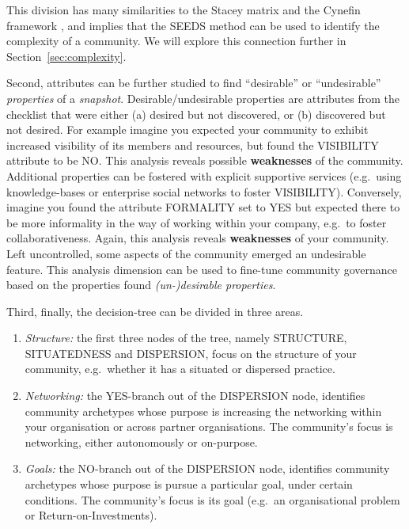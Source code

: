This division has many similarities to the Stacey matrix \cite{sta02aa} and the Cynefin framework \cite{snoboo07aa}, and implies that the SEEDS method can be used to identify the complexity of a community. We will explore this connection further in Section~\ref{sec:complexity}.

Second, attributes can be further studied to find ``desirable'' or ``undesirable'' \emph{properties} of a \emph{snapshot}. Desirable/undesirable properties are attributes from the checklist that were either (a) desired but not discovered, or (b) discovered but not desired. For example imagine you expected your community to exhibit increased visibility of its members and resources, but found the VISIBILITY attribute to be NO. This analysis reveals possible \textbf{weaknesses} of the community. Additional properties can be fostered with explicit supportive services (e.g.~using knowledge-bases or enterprise social networks to foster VISIBILITY). Conversely, imagine you found the attribute FORMALITY set to YES but expected there to be more informality in the way of working within your company, e.g.~to foster collaborativeness. Again, this analysis reveals \textbf{weaknesses} of your community. Left uncontrolled, some aspects of the community emerged an undesirable feature. This analysis dimension can be used to fine-tune community governance based on the properties found \emph{\mbox{(un-)desirable} properties}.

Third, finally, the decision-tree can be divided in three areas. 

\begin{enumerate} 
\item \emph{Structure:} the first three nodes of the tree, namely STRUCTURE, SITUATEDNESS and DISPERSION, focus on the structure of your community, e.g.~whether it has a situated or dispersed practice.
\item \emph{Networking:} the YES-branch out of the DISPERSION node, identifies community archetypes whose purpose is increasing the networking within your organisation or across partner organisations. The community's focus is networking, either autonomously or on-purpose.
\item \emph{Goals:} the NO-branch out of the DISPERSION node, identifies community archetypes whose purpose is pursue a particular goal, under certain conditions. The community's focus is its goal (e.g.~an organisational problem or Return-on-Investments).
\end{enumerate}

